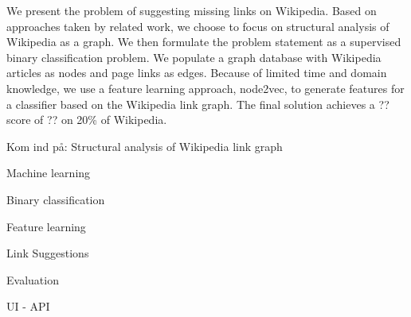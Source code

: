 We present the problem of suggesting missing links on Wikipedia. Based on approaches taken by related work, we choose to focus on structural analysis of Wikipedia as a graph. We then formulate the problem statement as a supervised binary classification problem. We populate a graph database with Wikipedia articles as nodes and page links as edges. Because of limited time and domain knowledge, we use a feature learning approach, node2vec, to generate features for a classifier based on the Wikipedia link graph. The final solution achieves a ?? score of ?? on 20\% of Wikipedia.


Kom ind på:
Structural analysis of Wikipedia link graph

Machine learning

Binary classification

Feature learning

Link Suggestions

Evaluation

UI - API